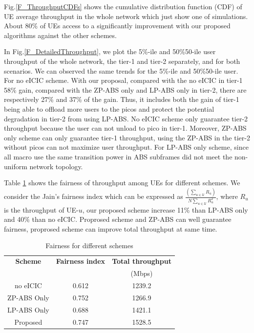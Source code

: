 \documentclass[journal]{IEEETran}
\begin{document}
Fig.\ref{F_ThroughputCDFs} shows the cumulative distribution function (CDF) of UE average throughput in the whole network which just show one of simulations. About 80\% of UEs access to a significantly improvement with our proposed algorithms against the other schemes.

In Fig.\ref{F_DetailedThroughput}, we plot the 5\%-ile and 50\%50-ile user throughput of the whole network, the tier-1 and tier-2 separately, and for both scenarios. We can observed the same trends for the 5\%-ile and 50\%50-ile user.
For no eICIC scheme. With our proposal, compared with the no eICIC in tier-1 58\% gain, compared with the ZP-ABS only and LP-ABS only in tier-2, there are respectively 27\% and 37\% of the gain. Thus, it includes both the gain of tier-1 being able to offload more users to the picos and protect the potential degradation in tier-2 from using LP-ABS. No eICIC scheme only guarantee tier-2 throughput because the user can not unload to pico in tier-1. Moreover, ZP-ABS only scheme can only guarantee tier-1 throughput, using the ZP-ABS in the tier-2 without picos can not maximize user throughput. For LP-ABS only scheme, since all macro use the same transition power in ABS subframes did not meet the non-uniform network topology.

Table \ref{T_Fairness} shows the fairness of throughput among UEs for different schemes. We consider the Jain's fairness index\cite{JainFairness} which can be expressed as $\frac{ (\sum_{u \in \mathcal{U}} R_u) }{ N \sum_{u \in \mathcal{U}} R_u^2}$, where $R_u$ is the throughput of UE-$u$, our proposed scheme increase 11\% than LP-ABS only and 40\% than no eICIC. Proprosed scheme and ZP-ABS can well guarantee fairness, proprosed scheme can improve total throughput at same time.

\begin{table}[!t]
\renewcommand{\arraystretch}{1.3}
\caption{Fairness for different schemes}\label{T_Fairness}
\centering
\begin{tabular}{c||c||c}
\hline
\bfseries Scheme & \bfseries Fairness index & \bfseries Total throughput\\
& &(Mbps)\\
\hline\hline\hline
no eICIC & 0.612 & 1239.2\\
ZP-ABS Only & 0.752 & 1266.9\\
LP-ABS Only & 0.688 & 1421.1\\
Proposed & 0.747 & 1528.5\\
\hline
\end{tabular}
\end{table}
\end{document}
